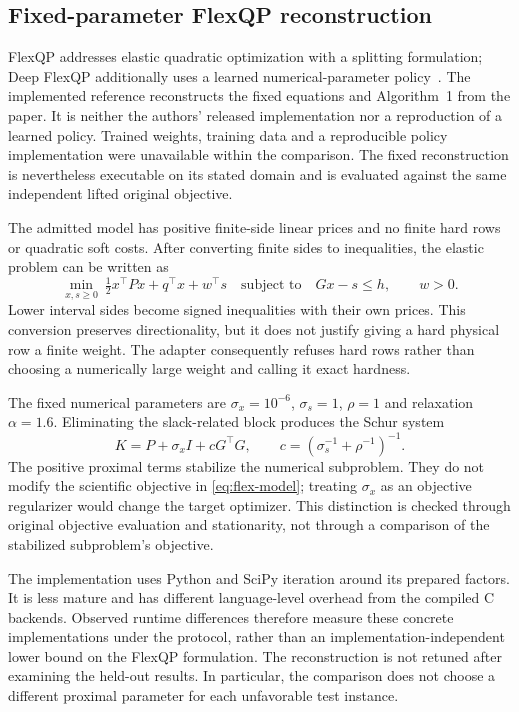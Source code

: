 \subsection{Fixed-parameter FlexQP reconstruction}\label{sec:flex}
FlexQP addresses elastic quadratic optimization with a splitting formulation;
Deep FlexQP additionally uses a learned numerical-parameter policy~\cite{flex}.
The implemented reference reconstructs the fixed equations and Algorithm~1 from
the paper. It is neither the authors' released implementation nor a reproduction
of a learned policy. Trained weights, training data and a reproducible policy
implementation were unavailable within the comparison. The fixed reconstruction
is nevertheless executable on its stated domain and is evaluated against the
same independent lifted original objective.

The admitted model has positive finite-side linear prices and no finite hard
rows or quadratic soft costs. After converting finite sides to inequalities,
the elastic problem can be written as
\begin{equation}\label{eq:flex-model}
 \min_{x,s\geq0}\ \tfrac12x^\top P x+q^\top x+w^\top s
 \quad\text{subject to}\quad Gx-s\leq h,\qquad w>0.
\end{equation}
Lower interval sides become signed inequalities with their own prices. This
conversion preserves directionality, but it does not justify giving a hard
physical row a finite weight. The adapter consequently refuses hard rows rather
than choosing a numerically large weight and calling it exact hardness.

The fixed numerical parameters are $\sigma_x=10^{-6}$, $\sigma_s=1$, $\rho=1$
and relaxation $\alpha=1.6$. Eliminating the slack-related block produces the
Schur system
\begin{equation}\label{eq:flex-system}
 K=P+\sigma_x I+cG^\top G,\qquad
 c=(\sigma_s^{-1}+\rho^{-1})^{-1}.
\end{equation}
The positive proximal terms stabilize the numerical subproblem. They do not
modify the scientific objective in \eqref{eq:flex-model}; treating $\sigma_x$
as an objective regularizer would change the target optimizer. This distinction
is checked through original objective evaluation and stationarity, not through
a comparison of the stabilized subproblem's objective.

The implementation uses Python and SciPy iteration around its prepared factors.
It is less mature and has different language-level overhead from the compiled
C backends. Observed runtime differences therefore measure these concrete
implementations under the protocol, rather than an implementation-independent
lower bound on the FlexQP formulation. The reconstruction is not retuned after
examining the held-out results. In particular, the comparison does not choose a
different proximal parameter for each unfavorable test instance.

